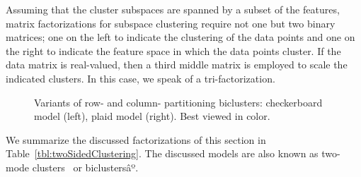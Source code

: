 Assuming that the cluster subspaces are spanned by a subset of the features, matrix factorizations for subspace clustering require not one but two binary matrices; one on the left to indicate the clustering of the data points and one on the right to indicate the feature space in which the data points cluster. If the data matrix is real-valued, then a third middle matrix is employed to scale the indicated clusters. In this case, we speak of a tri-factorization.  
\begin{figure}
    \centering
    
    \caption{Variants of row- and column- partitioning biclusters: checkerboard model (left), plaid model (right). Best viewed in color. }
    \label{fig:blockclusters}
\end{figure}
\begin{table}%
	\centering
    \caption{Overview of objective functions proposed for two-sided clustering}
\label{tbl:twoSidedClustering}
\end{table}
We summarize the discussed factorizations of this section in Table~\ref{tbl:twoSidedClustering}. The discussed models are also known as two-mode clusters~\citep{van2004two,van2009optimization} or biclustersâº\citep{busygin2008biclustering}.
